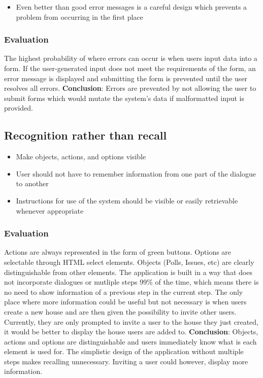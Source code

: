 \begin{itemize}
    \item Even better than good error messages is a careful design which prevents a problem from occurring in the first place
\end{itemize}

\subsubsection{Evaluation}
The highest probability of where errors can occur is when users input data into a form. If the user-generated input does not meet the requirements of the form, an error message is displayed and submitting the form is prevented until the user resolves all errors. \textbf{Conclusion}: Errors are prevented by not allowing the user to submit forms which would mutate the system's data if malformatted input is provided.

\subsection{Recognition rather than recall}

\begin{itemize}
    \item Make objects, actions, and options visible
    \item User should not have to remember information from one part of the dialogue to another
    \item Instructions for use of the system should be visible or easily retrievable whenever appropriate
\end{itemize}

\subsubsection{Evaluation}
Actions are always represented in the form of green buttons. Options are selectable through HTML select elements. Objects (Polls, Issues, etc) are clearly distinguishable from other elements. The application is built in a way that does not incorporate dialogues or mutliple steps 99\% of the time, which means there is no need to show information of a previous step in the current step. The only place where more information could be useful but not necessary is when users create a new house and are then given the possibility to invite other users. Currently, they are only prompted to invite a user to the house they just created, it would be better to display the house users are added to. \textbf{Conclusion}: Objects, actions and options are distinguishable and users immediately know what is each element is used for. The simplistic design of the application without multiple steps makes recalling unnecessary. Inviting a user could however, display more information.

